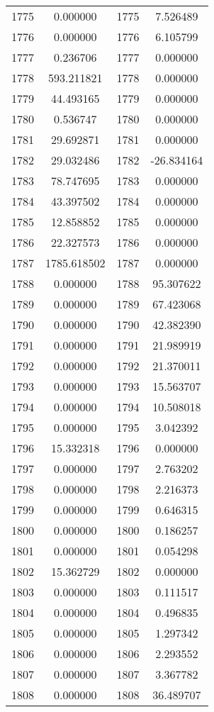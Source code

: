 \documentclass[12pt]{article}
\begin{document}
\begin{longtable}{@{}cccc@{}}
1775 & 0.000000 & 1775 & 7.526489 \\
1776 & 0.000000 & 1776 & 6.105799 \\
1777 & 0.236706 & 1777 & 0.000000 \\
1778 & 593.211821 & 1778 & 0.000000 \\
1779 & 44.493165 & 1779 & 0.000000 \\
1780 & 0.536747 & 1780 & 0.000000 \\
1781 & 29.692871 & 1781 & 0.000000 \\
1782 & 29.032486 & 1782 & -26.834164 \\
1783 & 78.747695 & 1783 & 0.000000 \\
1784 & 43.397502 & 1784 & 0.000000 \\
1785 & 12.858852 & 1785 & 0.000000 \\
1786 & 22.327573 & 1786 & 0.000000 \\
1787 & 1785.618502 & 1787 & 0.000000 \\
1788 & 0.000000 & 1788 & 95.307622 \\
1789 & 0.000000 & 1789 & 67.423068 \\
1790 & 0.000000 & 1790 & 42.382390 \\
1791 & 0.000000 & 1791 & 21.989919 \\
1792 & 0.000000 & 1792 & 21.370011 \\
1793 & 0.000000 & 1793 & 15.563707 \\
1794 & 0.000000 & 1794 & 10.508018 \\
1795 & 0.000000 & 1795 & 3.042392 \\
1796 & 15.332318 & 1796 & 0.000000 \\
1797 & 0.000000 & 1797 & 2.763202 \\
1798 & 0.000000 & 1798 & 2.216373 \\
1799 & 0.000000 & 1799 & 0.646315 \\
1800 & 0.000000 & 1800 & 0.186257 \\
1801 & 0.000000 & 1801 & 0.054298 \\
1802 & 15.362729 & 1802 & 0.000000 \\
1803 & 0.000000 & 1803 & 0.111517 \\
1804 & 0.000000 & 1804 & 0.496835 \\
1805 & 0.000000 & 1805 & 1.297342 \\
1806 & 0.000000 & 1806 & 2.293552 \\
1807 & 0.000000 & 1807 & 3.367782 \\
1808 & 0.000000 & 1808 & 36.489707 \\

\end{longtable}
\end{document}
